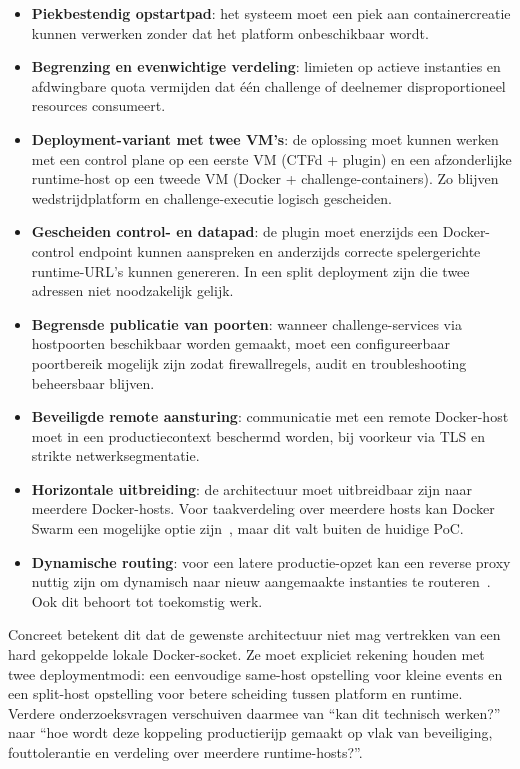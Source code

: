 \begin{itemize}
  \item \textbf{Piekbestendig opstartpad}: het systeem moet een piek aan containercreatie kunnen verwerken zonder dat het platform onbeschikbaar wordt.
  \item \textbf{Begrenzing en evenwichtige verdeling}: limieten op actieve instanties en afdwingbare quota vermijden dat één challenge of deelnemer disproportioneel resources consumeert.
  \item \textbf{Deployment-variant met twee VM's}: de oplossing moet kunnen werken met een control plane op een eerste VM (CTFd + plugin) en een afzonderlijke runtime-host op een tweede VM (Docker + challenge-containers). Zo blijven wedstrijdplatform en challenge-executie logisch gescheiden.
  \item \textbf{Gescheiden control- en datapad}: de plugin moet enerzijds een Docker-control endpoint kunnen aanspreken en anderzijds correcte spelergerichte runtime-URL's kunnen genereren. In een split deployment zijn die twee adressen niet noodzakelijk gelijk.
  \item \textbf{Begrensde publicatie van poorten}: wanneer challenge-services via hostpoorten beschikbaar worden gemaakt, moet een configureerbaar poortbereik mogelijk zijn zodat firewallregels, audit en troubleshooting beheersbaar blijven.
  \item \textbf{Beveiligde remote aansturing}: communicatie met een remote Docker-host moet in een productiecontext beschermd worden, bij voorkeur via TLS en strikte netwerksegmentatie.
  \item \textbf{Horizontale uitbreiding}: de architectuur moet uitbreidbaar zijn naar meerdere Docker-hosts. Voor taakverdeling over meerdere hosts kan Docker Swarm een mogelijke optie zijn~\autocite{DockerSwarm}, maar dit valt buiten de huidige PoC.
  \item \textbf{Dynamische routing}: voor een latere productie-opzet kan een reverse proxy nuttig zijn om dynamisch naar nieuw aangemaakte instanties te routeren~\autocite{Traefik}. Ook dit behoort tot toekomstig werk.
\end{itemize}

Concreet betekent dit dat de gewenste architectuur niet mag vertrekken van een hard gekoppelde lokale Docker-socket. Ze moet expliciet rekening houden met twee deploymentmodi: een eenvoudige same-host opstelling voor kleine events en een split-host opstelling voor betere scheiding tussen platform en runtime. Verdere onderzoeksvragen verschuiven daarmee van ``kan dit technisch werken?'' naar ``hoe wordt deze koppeling productierijp gemaakt op vlak van beveiliging, fouttolerantie en verdeling over meerdere runtime-hosts?''.
